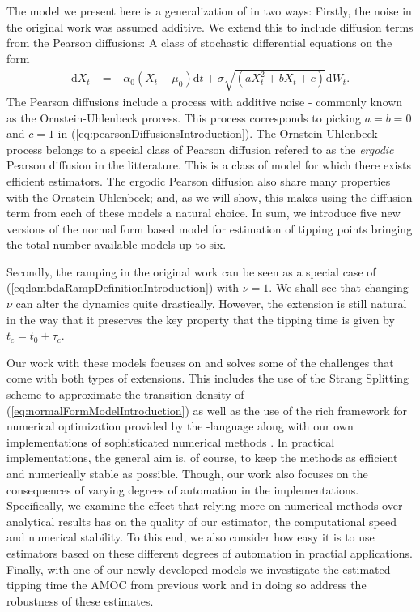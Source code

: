 The model we present here is a generalization of \cite[equation (1)]{Ditlevsen2023} in two ways: Firstly, the noise in the original work was assumed additive. We extend this to include diffusion terms from the Pearson diffusions: A class of stochastic differential equations on the form
\begin{align}
    \mathrm{d}X_t &= -\alpha_0\left(X_t - \mu_0\right)\mathrm{d}t + \sigma\sqrt{\left(aX_t^2 + bX_t + c\right)}\mathrm{d}W_t. \label{eq:pearsonDiffusionsIntroduction}
\end{align}
The Pearson diffusions include a process with additive noise - commonly known as the Ornstein-Uhlenbeck process. This process corresponds to picking $a = b = 0$ and $c = 1$ in (\ref{eq:pearsonDiffusionsIntroduction}). The Ornstein-Uhlenbeck process belongs to a special class of Pearson diffusion refered to as the \textit{ergodic} Pearson diffusion in the litterature. This is a class of model for which there exists efficient estimators. The ergodic Pearson diffusion also share many properties with the Ornstein-Uhlenbeck; and, as we will show, this makes using the diffusion term from each of these models a natural choice. In sum, we introduce five new versions of the normal form based model for estimation of tipping points bringing the total number available models up to six.

Secondly, the ramping in the original work \cite[equation (2)]{Ditlevsen2023} can be seen as a special case of (\ref{eq:lambdaRampDefinitionIntroduction}) with $\nu = 1$. We shall see that changing $\nu$ can alter the dynamics quite drastically. However, the extension is still natural in the way that it preserves the key property that the tipping time is given by $t_c = t_0 + \tau_c$.

Our work with these models focuses on and solves some of the challenges that come with both types of extensions. This includes the use of the Strang Splitting scheme\cite{SplittingSchemes} to approximate the transition density of (\ref{eq:normalFormModelIntroduction}) as well as the use of the rich framework for numerical optimization provided by the -language along with our own implementations of sophisticated numerical methods \cite{Rlang}. In practical implementations, the general aim is, of course, to keep the methods as efficient and numerically stable as possible. Though, our work also focuses on the consequences of varying degrees of automation in the implementations. Specifically, we examine the effect that relying more on numerical methods over analytical results has on the quality of our estimator, the computational speed and numerical stability. To this end, we also consider how easy it is to use estimators based on these different degrees of automation in practial applications. Finally, with one of our newly developed models we investigate the estimated tipping time the AMOC from previous work and in doing so address the robustness of these estimates.
